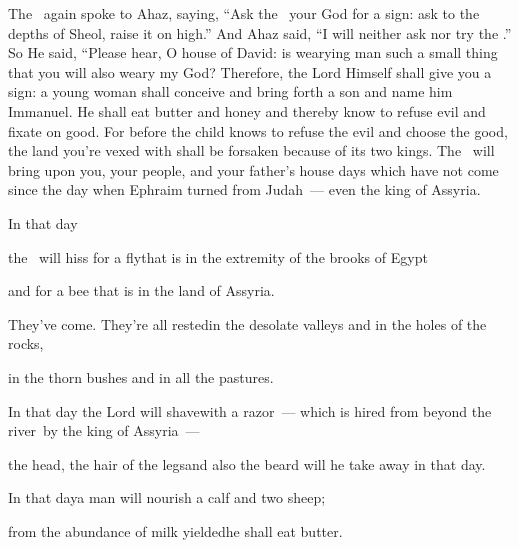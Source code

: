 \begin{inparaenum}
   The \lord\ again spoke to Ahaz, saying,%
   ``Ask the \lord\ your God for a sign: ask to the depths of Sheol, raise it on high.''%
   And Ahaz said, ``I will neither ask nor try the \lord.''%
   So He said, ``Please hear, O house of David: is wearying man such a small thing that you will also weary my God?%
   Therefore, the Lord Himself shall give you a sign: a young woman shall conceive and bring forth a son and name him Immanuel.%
   He shall eat butter and honey and thereby know to refuse evil and fixate on good.%
   For before the child knows to refuse the evil and choose the good, the land you're vexed with shall be forsaken because of its two kings.%
   The \lord\ will bring upon you, your people, and your father's house days which have not come since the day when Ephraim turned from Judah~--- even the king of Assyria.\smallskip%

  \pa{} In that day%

  \pb{}the \lord\ will hiss for a fly\pa{}that is in the extremity of the brooks of Egypt%

  \pb{}and for a bee that is in the land of Assyria.%

  \pa{} They've come. They're all rested\pa{}in the desolate valleys and in the holes of the rocks,%

  \pb{}in the thorn bushes and in all the pastures.%

  \pa{} In that day the Lord will shave\pa{}with a razor~--- which is hired from beyond the river\footnotemark\ by the king of Assyria~---%

  \pb{}the head, the hair of the legs\footnotemark\pa{}and also the beard will he take away in that day.%

  \pa{} In that day\pa{}a man will nourish a calf and two sheep;%

  \pa{} from the abundance of milk yielded\pa{}he shall eat butter.%


\end{inparaenum}
